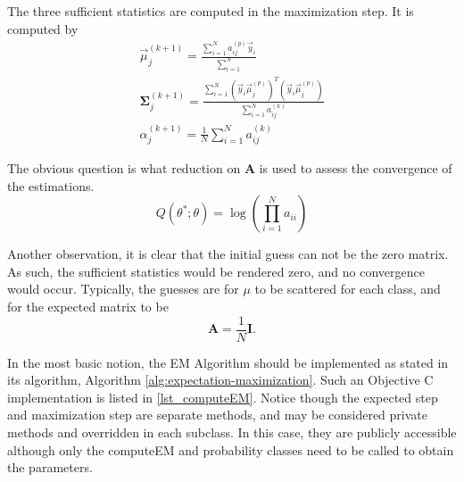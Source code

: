 \documentclass[12pt]{report}
\begin{document}
The three sufficient statistics are computed in the maximization step.   It is computed by
\begin{eqnarray}
\vec{\mu} _j ^{(k+1)} = \frac{\sum_{i=1} ^N a_{ij}^{(p)} \vec{y}_i} {\sum_{i=1}^N} \\
\mathbf{\Sigma} _j ^{(k+1)} = \frac {\sum_{i=1}^N (\vec{y}_i \vec{\mu}_j ^{(p)} )^T(\vec{y}_i \vec{\mu}_j ^{(p)} ) } {\sum_{i=1}^N a^{(k)}_{ij}}  \\
\alpha _j ^ {(k+1)} = \frac{1}{N} \sum_{i=1}^N a^{(k)}_{ij}
\end{eqnarray}



The obvious question is what reduction on $\mathbf{A}$ is used to assess the convergence of the estimations.  %
\begin{equation}
Q ( \theta ^* ; \theta ) =\log (\prod_{i=1} ^N  a_{ii} )
\end{equation}


Another observation, it is clear that the initial guess can not be the zero matrix.  As such, the sufficient statistics would be rendered zero, and no convergence would occur.   Typically, the guesses are for $\mu$ to be scattered for each class, and for the expected matrix to be 
\[ 
\mathbf{A} = \frac{1}{N} \mathbf{I}.
\]


In the most basic notion, the EM Algorithm should be implemented as stated in its algorithm, Algorithm \ref{alg:expectation-maximization}.  Such an Objective C implementation is listed in \ref{lst_computeEM}.  Notice though the expected step and maximization step are separate methods, and may be considered private methods and overridden in each subclass.  In this case, they are publicly accessible although only the computeEM and probability classes need to be called to obtain the parameters.  
\end{document}
